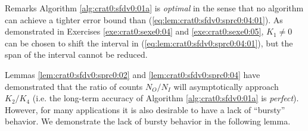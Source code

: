 \begin{vworklemmaparsection}{Remarks}
Algorithm \ref{alg:crat0:sfdv0:01a} is \emph{optimal} in the
sense that no algorithm can achieve a tighter error
bound than (\ref{eq:lem:crat0:sfdv0:sprc0:04:01}).  As 
demonstrated in Exercises \ref{exe:crat0:sexe0:04}
and \ref{exe:crat0:sexe0:05}, $K_1 \neq 0$ can be chosen
to shift the interval in (\ref{eq:lem:crat0:sfdv0:sprc0:04:01}), but
the span of the interval cannot be reduced.
\end{vworklemmaparsection}
\vworklemmafooter{}

Lemmas \ref{lem:crat0:sfdv0:sprc0:02} 
and \ref{lem:crat0:sfdv0:sprc0:04} have demonstrated that the ratio of 
counts $N_O/N_I$ will asymptotically
approach $K_2/K_4$ 
(i.e. the long-term accuracy of Algorithm \ref{alg:crat0:sfdv0:01a} 
is \emph{perfect}).  
However,
for many applications it is also desirable to have a lack of 
``bursty'' behavior.  We demonstrate the lack of bursty
behavior in the following lemma.

